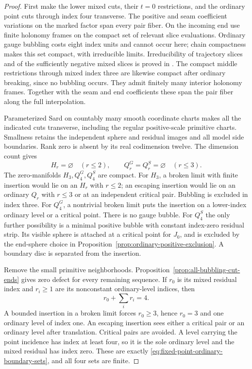 \documentclass[11pt]{amsart}
\theoremstyle{definition}
\theoremstyle{remark}
\theoremstyle{plain}
\begin{document}
\begin{proof}
First make the lower mixed cuts, their $t=0$
restrictions, and the ordinary point cuts through
index four transverse. The positive and seam
coefficient variations on the marked factor
span every pair fiber. On the incoming end
use finite holonomy frames on the compact set
of relevant slice evaluations. Ordinary gauge
bubbling costs eight index units and cannot
occur here; chain compactness makes this set
compact, with irreducible limits.
Irreducibility of trajectory slices and of
the sufficiently negative mixed slices is
proved in \cite[Section~7.2, pp.~89--90]{DaeFukLip21a}.
The compact middle restrictions through mixed
index three are likewise compact after ordinary
breaking, since no bubbling occurs.
They admit finitely many interior holonomy
frames. Together with the seam and end
coefficients these span the pair fiber along
the full interpolation.

Parameterized Sard on countably many smooth
coordinate charts makes all the indicated
cuts transverse, including the regular
positive-scale primitive charts. Smallness
retains the independent sphere and residual
images and all model side boundaries.
Rank zero is absent by its real codimension
twelve. The dimension count gives
\[
 H_r=\varnothing\quad(r\le2),\qquad
 Q_r^G=Q_r^S=\varnothing\quad(r\le3).
\]
The zero-manifolds $H_3,Q_4^G,Q_4^S$ are compact.
For $H_3$, a broken limit with finite insertion
would lie on an $H_r$ with $r\le2$;
an escaping insertion would lie on an ordinary
$Q_r$ with $r\le3$ or at an independent
critical pair. Bubbling is excluded in index
three. For $Q_4^G$, a nontrivial broken
limit puts the insertion on a lower-index
ordinary level or a critical point.
There is no gauge bubble.
For $Q_4^S$ the only further possibility
is a minimal positive bubble with constant
index-zero residual strip. Its visible
sphere is attached at a critical point
for $J_0$, and is excluded by the end-sphere
choice in
Proposition~\ref{prop:ordinary-positive-exclusion}.
A boundary disc is separated from the insertion.

Remove the small primitive neighborhoods.
Proposition~\ref{prop:all-bubbling-cut-ends}
gives zero defect for every remaining
sequence. If $r_0$ is its mixed residual
index and $r_i\ge1$ are its nonconstant
ordinary-level indices, then
\[
                         r_0+\sum_i r_i=4.
\]
A bounded insertion in a broken limit
forces $r_0\ge3$, hence $r_0=3$ and
one ordinary level of index one.
An escaping insertion sees either a
critical pair or an ordinary level
after translation. Critical pairs are
avoided. A level carrying the point
incidence has index at least four,
so it is the sole ordinary level and
the mixed residual has index zero.
These are exactly
\eqref{eq:fixed-point-ordinary-boundary-sets},
and all four sets are finite.


\end{proof}
\end{document}

